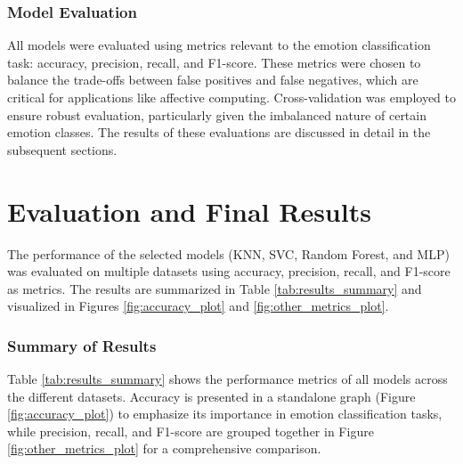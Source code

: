 \documentclass{article}
\begin{document}
\subsubsection*{Model Evaluation}

All models were evaluated using metrics relevant to the emotion classification task: accuracy, precision, recall, and 
F1-score. These metrics were chosen to balance the trade-offs between false positives and false negatives, which are critical 
for applications like affective computing. Cross-validation was employed to ensure robust evaluation, particularly given the 
imbalanced nature of certain emotion classes. The results of these evaluations are discussed in detail in the subsequent sections.








\section*{Evaluation and Final Results}

The performance of the selected models (KNN, SVC, Random Forest, and MLP) was evaluated on multiple datasets using accuracy, 
precision, recall, and F1-score as metrics. The results are summarized in Table \ref{tab:results_summary} and visualized in 
Figures \ref{fig:accuracy_plot} and \ref{fig:other_metrics_plot}.

\subsubsection*{Summary of Results}

Table \ref{tab:results_summary} shows the performance metrics of all models across the different datasets. Accuracy is 
presented in a standalone graph (Figure \ref{fig:accuracy_plot}) to emphasize its importance in emotion classification 
tasks, while precision, recall, and F1-score are grouped together in Figure \ref{fig:other_metrics_plot} for a 
comprehensive comparison.
\end{document}
